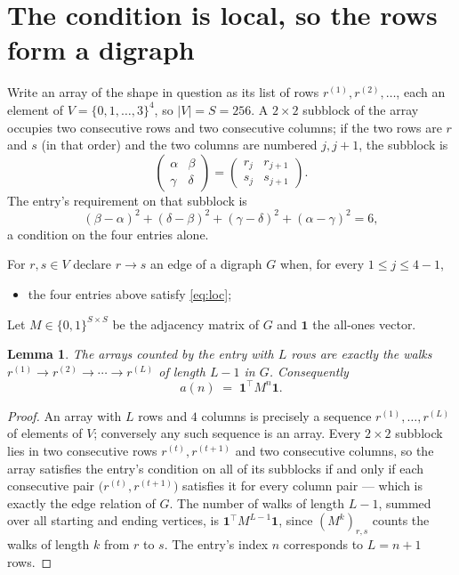 \documentclass[11pt,a4paper]{article}
\theoremstyle{plain}
\newtheorem{lemma}[theorem]{Lemma}
\theoremstyle{definition}
\begin{document}
\section{The condition is local, so the rows form a digraph}

Write an array of the shape in question as its list of rows
$r^{(1)},r^{(2)},\dots$, each an element of
$V=\{0,1,\dots,3\}^{4}$, so $|V|=S=256$. A $2\times2$ subblock of the array
occupies two consecutive rows and two consecutive columns; if the two rows are $r$
and $s$ (in that order) and the two columns are numbered $j,j+1$,
the subblock is
\[
\begin{pmatrix}\alpha&\beta\\\gamma&\delta\end{pmatrix}=\begin{pmatrix}r_j&r_{j+1}\\s_j&s_{j+1}\end{pmatrix}.
\]
The entry's requirement on that subblock is
\begin{equation}\label{eq:loc}
(\beta-\alpha)^2+(\delta-\beta)^2+(\gamma-\delta)^2+(\alpha-\gamma)^2=6,
\end{equation}
a condition on the four entries alone.

For $r,s\in V$ declare $r\to s$ an edge of a digraph $G$ when, for every
$1\le j\le 4-1$,
\begin{itemize}
\item the four entries above satisfy \eqref{eq:loc};

\end{itemize}
Let $M\in\{0,1\}^{S\times S}$ be the adjacency matrix of $G$ and $\mathbf{1}$ the
all-ones vector.

\begin{lemma}\label{lem:walk}
The arrays counted by the entry with $L$ rows are exactly the walks
$r^{(1)}\to r^{(2)}\to\cdots\to r^{(L)}$ of length $L-1$ in $G$. Consequently
\[
a(n)\;=\;\mathbf{1}^{\!\top}M^{n}\mathbf{1} .
\]
\end{lemma}

\begin{proof}
An array with $L$ rows and $4$ columns is precisely a sequence
$r^{(1)},\dots,r^{(L)}$ of elements of $V$; conversely any such sequence is an array.
Every $2\times2$ subblock lies in two consecutive rows $r^{(t)},r^{(t+1)}$ and two
consecutive columns, so the array satisfies the entry's condition on all of its subblocks
if and only if each consecutive pair $\bigl(r^{(t)},r^{(t+1)}\bigr)$ satisfies it for
every column pair --- which is exactly the edge relation of $G$. The number of walks of
length $L-1$, summed over all starting and ending vertices, is
$\mathbf{1}^{\!\top}M^{L-1}\mathbf{1}$, since $(M^{k})_{r,s}$ counts the walks of
length $k$ from $r$ to $s$. The entry's index $n$ corresponds to $L=n+1$ rows.
\end{proof}
\end{document}
